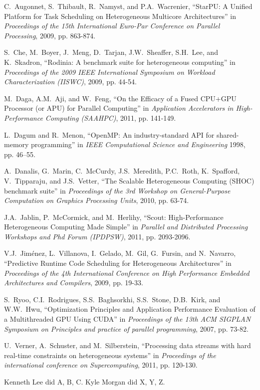 \documentclass[journal]{IEEEtran}
\begin{document}
\begin{thebibliography}{1}

C.~Augonnet, S.~Thibault, R.~Namyst, and P.A.~Wacrenier,
``StarPU: A Unified Platform for Task Scheduling on Heterogeneous Multicore Architectures'' in
\emph{Proceedings of the 15th International Euro-Par Conference on Parallel Processing}, 2009, pp. 863-874.

S.~Che, M.~Boyer, J.~Meng, D.~Tarjan, J.W.~Sheaffer, S.H.~Lee, and K.~Skadron,
``Rodinia: A benchmark suite for heterogeneous computing'' in
\emph{Proceedings of the 2009 IEEE International Symposium on Workload Characterization (IISWC)}, 2009, pp. 44-54.

M.~Daga, A.M.~Aji, and W.~Feng,
``On the Efficacy of a Fused CPU+GPU Processor (or APU) for Parallel Computing'' in
\emph{Application Accelerators in High-Performance Computing (SAAHPC)}, 2011, pp. 141-149.

L.~Dagum and R.~Menon,
``OpenMP: An industry-standard API for shared-memory programming'' in
\emph{IEEE Computational Science and Engineering} 1998, pp. 46–55.

A.~Danalis, G.~Marin, C.~McCurdy, J.S.~Meredith, P.C.~Roth, K.~Spafford, V.~Tipparaju, and J.S.~Vetter,
``The Scalable Heterogeneous Computing (SHOC) benchmark suite'' in
\emph{Proceedings of the 3rd Workshop on General-Purpose Computation on Graphics Processing Units}, 2010, pp. 63-74.

J.A.~Jablin, P.~McCormick, and M.~Herlihy,
``Scout: High-Performance Heterogeneous Computing Made Simple'' in
\emph{Parallel and Distributed Processing Workshops and Phd Forum (IPDPSW)}, 2011, pp. 2093-2096.

V.J.~Jiménez, L.~Villanova, I.~Gelado, M.~Gil, G.~Fursin, and N.~Navarro,
``Predictive Runtime Code Scheduling for Heterogeneous Architectures'' in
\emph{Proceedings of the 4th International Conference on High Performance Embedded Architectures and Compilers}, 2009, pp. 19-33.

S.~Ryoo, C.I.~Rodrigues, S.S.~Baghsorkhi, S.S.~Stone, D.B.~Kirk, and W.W.~Hwu,
``Optimization Principles and Application Performance Evaluation of a Multithreaded GPU Using CUDA'' in
\emph{Proceedings of the 13th ACM SIGPLAN Symposium on Principles and practice of parallel programming}, 2007, pp. 73-82.

U.~Verner, A.~Schuster, and M.~Silberstein,
``Processing data streams with hard real-time constraints on heterogeneous systems'' in
\emph{Proceedings of the international conference on Supercomputing}, 2011, pp. 120-130.

\end{thebibliography}

\newpage
{}
Kenneth Lee did A, B, C.  Kyle Morgan did X, Y, Z.
\end{document}
